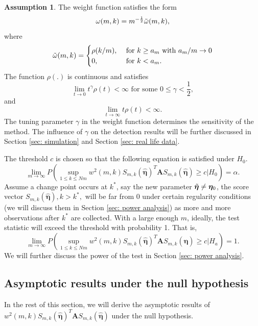 \documentclass{article}
\theoremstyle{definition}
\newtheorem{assumption}{Assumption}
\begin{document}
\begin{assumption}
\label{assumption: weight function}
The weight function satisfies the form
$$
\omega (m,k) = m^{-\frac{1}{2}}\Tilde{\omega}(m,k),
$$
where
$$
\Tilde{\omega}(m,k) = \begin{cases} \rho(k/m),& \text{ for }k \geq a_m \text{ with } a_m/m \rightarrow0\\
                                    0, &\text{ for } k<a_m.\end{cases}
$$
The function $\rho(.)$ is continuous and satisfies 
$$
\underset{t\rightarrow 0} {\lim} t^{\gamma}\rho(t) <\infty \text{ for some } 0\leq \gamma < \frac{1}{2},
$$
and
$$
\underset{t \rightarrow \infty}{\lim} t\rho(t)<\infty.
$$
The tuning parameter $\gamma$ in the weight function determines the sensitivity of the method. The influence of $\gamma$ on the detection results will be further discussed in Section \ref{sec: simulation} and Section \ref{sec: real life data}.\\
\end{assumption} 
The threshold $c$ is chosen so that the following equation is satisfied under $H_0$. 
\begin{equation*}
    \underset{m\rightarrow \infty}{\lim}P(\underset{1\leq k \leq Nm}{\sup}w^2(m,k)S_{m,k}(\hat{\bm{\eta}})^T\bm{A}S_{m,k}(\hat{\bm{\eta}}) \geq c|H_0)  = \alpha.
\end{equation*}
Assume a change point occurs at $k^*$, say the new parameter $\Tilde{\bm{\eta}} \neq \bm{\eta}_0$, the score vector $S_{m,k}(\hat{\bm{\eta}}), k>k^*,$ will be far from 0 under certain regularity conditions (we will discuss them in Section \ref{sec: power analysis}) as more and more observations after $k^*$ are collected. With a large enough $m$, ideally, the test statistic will exceed the threshold with probability 1. That is, 
\begin{equation*}
    \underset{m\rightarrow \infty}{\lim}P(\underset{1\leq k \leq Nm}{\sup}w^2(m,k)S_{m,k}(\hat{\bm{\eta}})^T\bm{A}S_{m,k}(\hat{\bm{\eta}}) \geq c|H_a)  = 1.
\end{equation*}
We will further discuss the power of the test in Section \ref{sec: power analysis}.
\subsection{Asymptotic results under the null hypothesis}
In the rest of this section, we will derive the asymptotic results of $w^2(m,k)S_{m,k}(\hat{\bm{\eta}})^T\bm{A}S_{m,k}(\hat{\bm{\eta}})$ under the null hypothesis.
\end{document}
